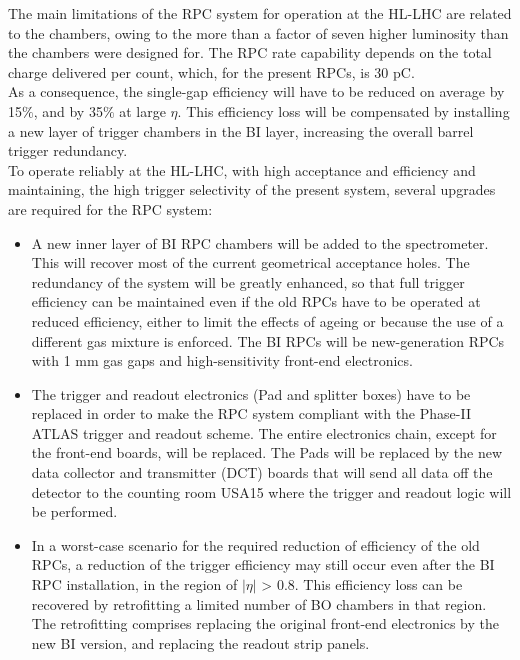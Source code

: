 \noindent The main limitations of the RPC system for operation at the HL-LHC are related to the
chambers, owing to the more than a factor of seven higher luminosity than the chambers
were designed for. The RPC rate capability depends on the total charge delivered per count,
which, for the present RPCs, is 30 pC.\\
As a consequence, the single-gap efficiency will have to be reduced on average by 15$\%$, and by
35$\%$ at large $\eta$. This efficiency loss will be compensated by installing a new layer of trigger chambers in the BI layer, increasing the overall barrel trigger redundancy.\\
To operate reliably at the HL-LHC, with high acceptance and efficiency and maintaining, the high trigger selectivity of the present system, several upgrades are required for the RPC system:
\begin{itemize}
	\item A new inner layer of BI RPC chambers will be added to the spectrometer. This will
recover most of the current geometrical acceptance holes. The redundancy of the
system will be greatly enhanced, so that full trigger efficiency can be maintained even
if the old RPCs have to be operated at reduced efficiency, either to limit the effects of
ageing or because the use of a different gas mixture is enforced. The BI RPCs will be
new-generation RPCs with 1 mm gas gaps and high-sensitivity front-end electronics.
	\item The trigger and readout electronics (Pad and splitter boxes) have to be replaced in order
to make the RPC system compliant with the Phase-II ATLAS trigger and readout
scheme. The entire electronics chain, except for the front-end boards, will be replaced.
The Pads will be replaced by the new data collector and transmitter (DCT) boards that
will send all data off the detector to the counting room USA15 where the trigger and
readout logic will be performed.
	\item In a worst-case scenario for the required reduction of efficiency of the old RPCs, a
reduction of the trigger efficiency may still occur even after the BI RPC installation,
in the region of $|\eta|$ > 0.8. This efficiency loss can be recovered by retrofitting a limited
number of BO chambers in that region. The retrofitting comprises replacing the
original front-end electronics by the new BI version, and replacing the readout strip
panels.
\end{itemize}
\newpage
